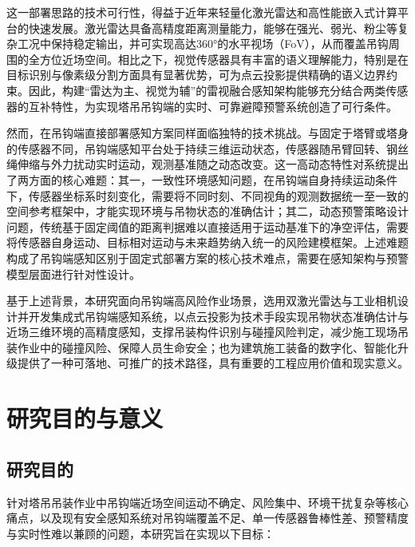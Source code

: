 这一部署思路的技术可行性，得益于近年来轻量化激光雷达和高性能嵌入式计算平台的快速发展\cite{5,7}。激光雷达具备高精度距离测量能力，能够在强光、弱光、粉尘等复杂工况中保持稳定输出，并可实现高达360°的水平视场（FoV），从而覆盖吊钩周围的全方位近场空间。相比之下，视觉传感器具有丰富的语义理解能力，特别是在目标识别与像素级分割方面具有显著优势，可为点云投影提供精确的语义边界约束。因此，构建“雷达为主、视觉为辅”的雷视融合感知架构能够充分结合两类传感器的互补特性\cite{1,2}，为实现塔吊吊钩端的实时、可靠避障预警系统创造了可行条件。

然而，在吊钩端直接部署感知方案同样面临独特的技术挑战。与固定于塔臂或塔身的传感器不同，吊钩端感知平台处于持续三维运动状态，传感器随吊臂回转、钢丝绳伸缩与外力扰动实时运动，观测基准随之动态改变。这一高动态特性对系统提出了两方面的核心难题：其一，一致性环境感知问题，在吊钩端自身持续运动条件下，传感器坐标系时刻变化，需要将不同时刻、不同视角的观测数据统一至一致的空间参考框架中，才能实现环境与吊物状态的准确估计；其二，动态预警策略设计问题，传统基于固定阈值的距离判据难以直接适用于运动基准下的净空评估，需要将传感器自身运动、目标相对运动与未来趋势纳入统一的风险建模框架。上述难题构成了吊钩端感知区别于固定式部署方案的核心技术难点，需要在感知架构与预警模型层面进行针对性设计\cite{5,10}。

基于上述背景，本研究面向吊钩端高风险作业场景，选用双激光雷达与工业相机设计并开发集成式吊钩端感知系统，以点云投影为技术手段实现吊物状态准确估计与近场三维环境的高精度感知，支撑吊装构件识别与碰撞风险判定，减少施工现场吊装作业中的碰撞风险、保障人员生命安全；也为建筑施工装备的数字化、智能化升级提供了一种可落地、可推广的技术路径，具有重要的工程应用价值和现实意义。

\section{研究目的与意义}\label{ux7814ux7a76ux76eeux7684ux4e0eux610fux4e49}

\subsection{研究目的}\label{ux7814ux7a76ux76eeux7684}

针对塔吊吊装作业中吊钩端近场空间运动不确定、风险集中、环境干扰复杂等核心痛点，以及现有安全感知系统对吊钩端覆盖不足、单一传感器鲁棒性差、预警精度与实时性难以兼顾的问题，本研究旨在实现以下目标：

